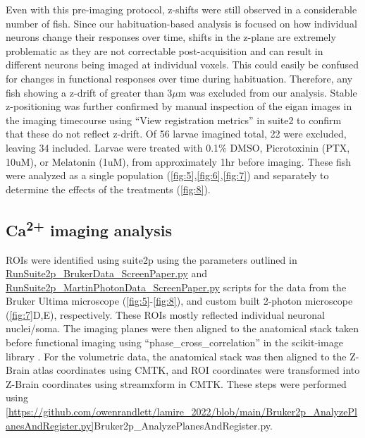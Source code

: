\documentclass[9pt,lineno]{RandlettLab_elife}
\begin{document}
Even with this pre-imaging protocol, z-shifts were still observed in a considerable number of fish. Since our habituation-based analysis is focused on how individual neurons change their responses over time, shifts in the z-plane are extremely problematic as they are not correctable post-acquisition and can result in different neurons being imaged at individual voxels. This could easily be confused for changes in functional responses over time during habituation. Therefore, any fish showing a z-drift of greater than 3$\mu$m was excluded from our analysis. Stable z-positioning was further confirmed by manual inspection of the eigan images in the imaging timecourse using “View registration metrics” in suite2 to confirm that these do not reflect z-drift. Of 56 larvae imagined total, 22 were excluded, leaving 34 included. Larvae were treated with 0.1\% DMSO, Picrotoxinin (PTX, 10uM), or Melatonin (1uM), from approximately 1hr before imaging. These fish were analyzed as a single population (\autoref{fig:5},\autoref{fig:6},\autoref{fig:7}) and separately to determine the effects of the treatments (\autoref{fig:8}). 

\subsection{Ca\textsuperscript{2+} imaging analysis}

ROIs were identified using suite2p \cite{Pachitariu2017-ad} using the parameters outlined in 
\\ \href{https://github.com/owenrandlett/lamire_2022/blob/main/RunSuite2p_BrukerData_ScreenPaper.py}{RunSuite2p\_BrukerData\_ScreenPaper.py} and  \href{https://github.com/owenrandlett/lamire_2022/blob/main/RunSuite2p_MartinPhotonData_ScreenPaper.py}{RunSuite2p\_MartinPhotonData\_ScreenPaper.py} scripts for the data from the Bruker Ultima microscope (\autoref{fig:5}-\autoref{fig:8}), and custom built 2-photon microscope (\autoref{fig:7}D,E), respectively. These ROIs mostly reflected individual neuronal nuclei/soma. The imaging planes were then aligned to the anatomical stack taken before functional imaging using “phase\_cross\_correlation” in the scikit-image library \cite{Van_der_Walt2014-hx}. For the volumetric data, the anatomical stack was then aligned to the Z-Brain atlas coordinates using CMTK, and ROI coordinates were transformed into Z-Brain coordinates using streamxform in CMTK. These steps were performed using 
\\ \ref{https://github.com/owenrandlett/lamire_2022/blob/main/Bruker2p_AnalyzePlanesAndRegister.py}{Bruker2p\_AnalyzePlanesAndRegister.py}. 
\end{document}
